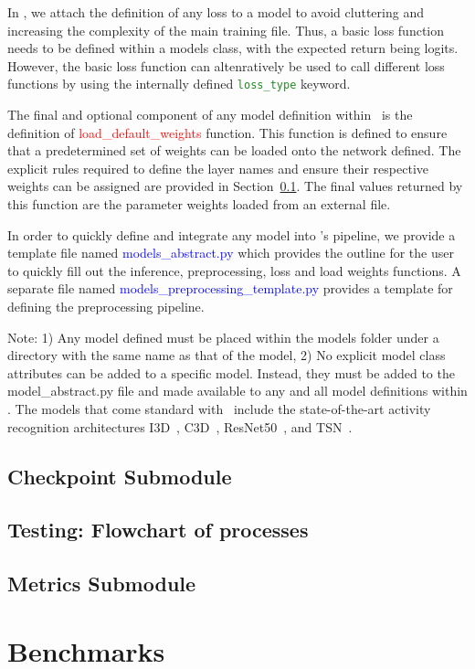 \documentclass{llncs}
\begin{document}
In \acro, we attach the definition of any loss to a model to avoid cluttering and increasing the complexity of the main training file.
Thus, a basic loss function needs to be defined within a models class, with the expected return being logits.
However, the basic loss function can altenratively be used to call different loss functions by using the internally defined \texttt{\textcolor{ForestGreen}{loss\_type}} keyword.

The final and optional component of any model definition within \acro~is the definition of \textcolor{red}{load\_default\_weights} function.
This function is defined to ensure that a predetermined set of weights can be loaded onto the network defined.
The explicit rules required to define the layer names and ensure their respective weights can be assigned are provided in Section~\ref{sec:checkpoint}.
The final values returned by this function are the parameter weights loaded from an external file. 

In order to quickly define and integrate any model into \acro's pipeline, we provide a template file named \textcolor{blue}{models\_abstract.py} which provides the outline for the user to quickly fill out the inference, preprocessing, loss and load weights functions.
A separate file named \textcolor{blue}{models\_preprocessing\_template.py} provides a template for defining the preprocessing pipeline.

Note: 1) Any model defined must be placed within the models folder under a directory with the same name as that of the model,
2) No explicit model class attributes can be added to a specific model. Instead, they must be added to the model\_abstract.py file and made available to any and all model definitions within \acro.
The models that come standard with \acro~include the state-of-the-art activity recognition architectures I3D~\cite{}, C3D~\cite{}, ResNet50~\cite{}, and TSN~\cite{}.

\subsection{Checkpoint Submodule}
\label{sec:checkpoint}

\subsection{Testing: Flowchart of processes}
\label{sec:testing}

\subsection{Metrics Submodule}
\label{sec:metrics}

\section{Benchmarks}
\label{sec:benchmarks}

\clearpage



\end{document}
